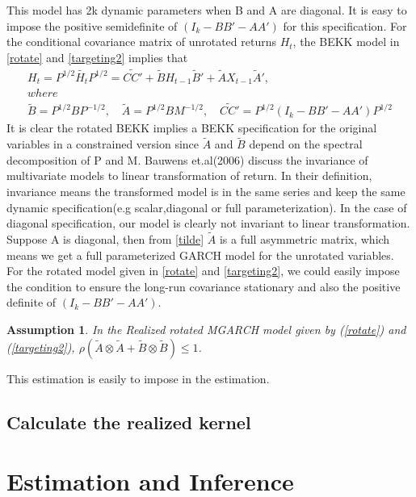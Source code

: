 \documentclass[titlepage,11pt]{article}
\newtheorem{assumption}{Assumption}
\begin{document}
This model has 2k dynamic parameters when B and A are diagonal. It is easy to impose the positive semidefinite of $(I_k-BB'-AA')$ for this specification. For the conditional covariance matrix of unrotated returns $H_t$, the BEKK model in \ref{rotate} and \ref{targeting2} implies that
\begin{align}
\label{tilde}
H_t = P^{1/2}\tilde{H_t}P^{1/2} = \tilde{CC'} + \tilde{B} H_{t-1} \tilde{B}' + \tilde{A} X_{t-1} \tilde{A}', \nonumber  \\
 where \nonumber \\
 \tilde{B} = P^{1/2} B P^{-1/2}, \quad \tilde{A} = P^{1/2} B M^{-1/2}, 
 \quad \tilde{CC'} = P^{1/2} (I_k-BB'-AA') P^{1/2}
\end{align}
It is clear the rotated BEKK implies a BEKK specification for the original variables in a constrained version since $\tilde{A}$ and $\tilde{B}$ depend on the spectral decomposition of P and M. 
Bauwens et.al(2006) discuss the invariance of multivariate models to linear transformation of return. In their definition, invariance means the transformed model is in the same series and keep the same dynamic specification(e.g scalar,diagonal or full parameterization). In the case of diagonal specification, our model is clearly not invariant to linear transformation. Suppose A is diagonal, then from \ref{tilde} $\tilde{A} $ is a full asymmetric matrix, which means we get a full parameterized GARCH model for the unrotated variables. 
For the rotated model given in \ref{rotate} and \ref{targeting2}, we could easily impose the condition to ensure the long-run covariance stationary and also the positive definite of $(I_k-BB'-AA')$.

\begin{assumption}
	\label{ass_2}
	In the Realized rotated MGARCH model given by (\ref{rotate}) and (\ref{targeting2}), $\rho(\tilde{A} \otimes \tilde{A}+\tilde{B} \otimes \tilde{B}) \le 1$.
\end{assumption}
This estimation is easily to impose in the estimation.


\subsection{Calculate the realized kernel}

\section{Estimation and Inference}
\end{document}
